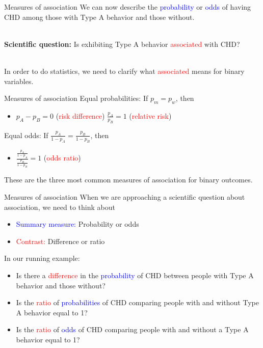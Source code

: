 \documentclass[10pt,t]{beamer}
\begin{document}
\begin{frame}{Measures of association}
	We can now describe the \textcolor{blue}{probability} or \textcolor{blue}{odds} of having CHD among those with Type A behavior and those without. 
	\\ ~\
	
	\textbf{Scientific question:} Is exhibiting Type A behavior \textcolor{red}{associated} with CHD? 
	\\ ~\
	
	In order to do statistics, we need to clarify what \textcolor{red}{associated} means for binary variables.
\end{frame}

\begin{frame}{Measures of association}
Equal probabilities: If $p_m = p_w$, then
	\begin{itemize}
		\item[] $p_A - p_B = 0$ (\textcolor{red}{risk difference}) \quad \quad \quad $\frac{p_A}{p_B} = 1$ (\textcolor{red}{relative risk})
	\end{itemize}
	\vspace{0.8cm}
Equal odds: If $\frac{p_A}{1-p_A} = \frac{p_B}{1-p_B}$, then
	\begin{itemize}
		\item[] $\frac{\frac{p_A}{1-p_A}}{\frac{p_B}{1-p_B}}=1$ (\textcolor{red}{odds ratio})
	\end{itemize}
\vspace{0.8cm}
These are the three most common measures of association for binary outcomes. 
\end{frame}

\begin{frame}{Measures of association}
When we are approaching a scientific question about association, we need to think about
\begin{itemize}
	\item \textcolor{blue}{Summary measure:} Probability or odds
	\item \textcolor{red}{Contrast:} Difference or ratio
\end{itemize}
\vspace{0.5cm}
In our running example:
\begin{itemize}
	\item Is there a \textcolor{red}{difference} in the \textcolor{blue}{probability} of CHD between people with Type A behavior and those without? \pause
	\item Is the \textcolor{red}{ratio} of \textcolor{blue}{probabilities} of CHD comparing people with and without Type A behavior equal to 1? \pause
	\item Is the \textcolor{red}{ratio} of \textcolor{blue}{odds} of CHD comparing people with and without a Type A behavior equal to 1? \pause
\end{itemize}
\end{frame}
\end{document}

